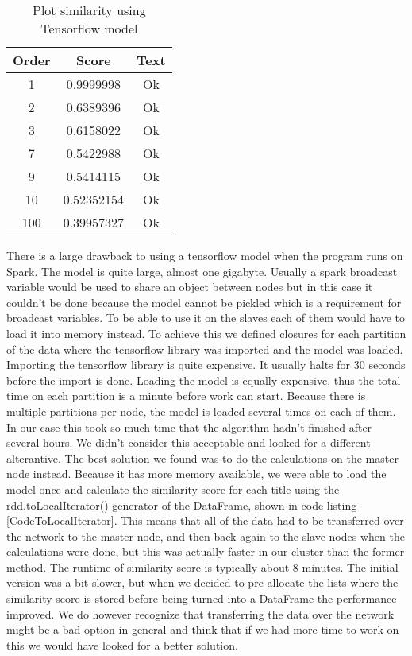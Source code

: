 \begin{table}[H]
    \centering
        \begin{tabular}{ |c|c|c| } 
            \hline
            \textbf{Order} & \textbf{Score} & \textbf{Text} \\ 
            \hline
            1 & 0.9999998 & Ok \\
            2 & 0.6389396 & Ok \\
            3 & 0.6158022 & Ok \\
            7 & 0.5422988 & Ok  \\
            9 & 0.5414115 & Ok \\
            10 & 0.52352154 & Ok \\
            100 & 0.39957327 & Ok \\
            \hline
        \end{tabular}
        \caption{Plot similarity using Tensorflow model}
        \label{tab:tfsim}
\end{table}

There is a large drawback to using a tensorflow model when the program runs on Spark. The model is quite large, almost one gigabyte. Usually a spark broadcast variable would be used to share an object between nodes but in this case it couldn’t be done because the model cannot be pickled which is a requirement for broadcast variables. To be able to use it on the slaves each of them would have to load it into memory instead. To achieve this we defined closures for each partition of the data where the tensorflow library was imported and the model was loaded. Importing the tensorflow library is quite expensive. It usually halts for 30 seconds before the import is done. Loading the model is equally expensive, thus the total time on each partition is a minute before work can start. Because there is multiple partitions per node, the model is loaded several times on each of them. In our case this took so much time that the algorithm hadn’t finished after several hours. We didn’t consider this acceptable and looked for a different alterantive. The best solution we found was to do the calculations on the master node instead. Because it has more memory available, we were able to load the model once and calculate the similarity score for each title using the rdd.toLocalIterator() generator of the DataFrame, shown in code listing \ref{CodeToLocalIterator}. This means that all of the data had to be transferred over the network to the master node, and then back again to the slave nodes when the calculations were done, but this was actually faster in our cluster than the former method. The runtime of similarity score is typically about 8 minutes. The initial version was a bit slower, but when we decided to pre-allocate the lists where the similarity score is stored before being turned into a DataFrame the performance improved. We do however recognize that transferring the data over the network might be a bad option in general and think that if we had more time to work on this we would have looked for a better solution.



